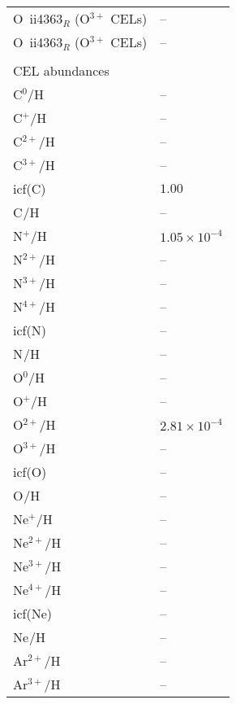 \begin{longtable}[l]{ll}
 O~{\sc ii}4363$_R$ (O$^{3+}$ CELs)  & -- \\
 O~{\sc ii}4363$_R$ (O$^{3+}$ CELs)  & -- \\
 \vspace{0.2cm}\\\multicolumn{2}{l}{CEL abundances}\\ \hline
 C$^{0}$/H                           & -- \\
 C$^{+}$/H                           & -- \\
 C$^{2+}$/H                          & -- \\
 C$^{3+}$/H                          & -- \\
 icf(C)                              & $  1.00$\\
 C$^{}$/H                            & -- \\
 N$^{+}$/H                           & $  1.05\times 10^{ -4}$\\
 N$^{2+}$/H                          & -- \\
 N$^{3+}$/H                          & -- \\
 N$^{4+}$/H                          & -- \\
 icf(N)                              & -- \\
 N$^{}$/H                            & -- \\
 O$^{0}$/H                           & -- \\
 O$^{+}$/H                           & -- \\
 O$^{2+}$/H                          & $  2.81\times 10^{ -4}$\\
 O$^{3+}$/H                          & -- \\
 icf(O)                              & -- \\
 O$^{}$/H                            & -- \\
 Ne$^{+}$/H                          & -- \\
 Ne$^{2+}$/H                         & -- \\
 Ne$^{3+}$/H                         & -- \\
 Ne$^{4+}$/H                         & -- \\
 icf(Ne)                             & -- \\
 Ne$^{}$/H                           & -- \\
 Ar$^{2+}$/H                         & -- \\
 Ar$^{3+}$/H                         & -- \\

\end{longtable}
